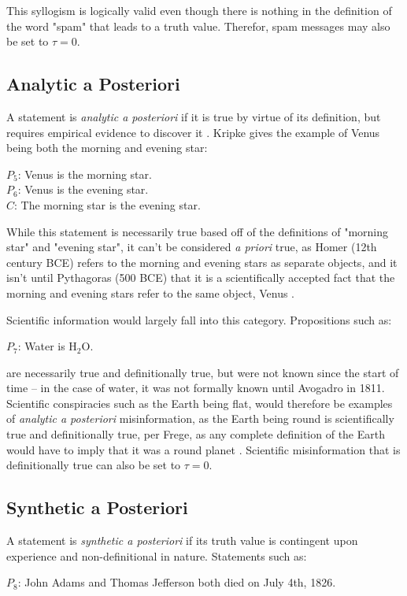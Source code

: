 \documentclass[12pt]{article}
\begin{document}
This syllogism is logically valid even though there is nothing in the definition of the word "spam" that leads to a truth value. Therefor, spam messages may also be set to $\tau = 0$.


\subsection{Analytic a Posteriori}
A statement is \textit{analytic a posteriori} if it is true by virtue of its definition, but requires empirical evidence to discover it \cite{kripke1972naming}. Kripke gives the example of Venus being both the morning and evening star: \begin{center}
   $P_5$: Venus is the morning star.\\
$P_6$: Venus is the evening star.\\
$C$: The morning star is the evening star. 
\end{center}


While this statement is necessarily true based off of the definitions of "morning star" and "evening star", it can't be considered \textit{a priori} true, as Homer (12th century BCE) refers to the morning and evening stars as separate objects, and it isn't until Pythagoras (500 BCE) that it is a scientifically accepted fact that the morning and evening stars refer to the same object, Venus \cite{dunne1978voyage}.

Scientific information would largely fall into this category. Propositions such as: 
\begin{center}
    $P_7$: Water is H$_2$O.
\end{center} 
are necessarily true and definitionally true, but were not known since the start of time -- in the case of water, it was not formally known until Avogadro in 1811. Scientific conspiracies such as the Earth being flat, would therefore be examples of \textit{analytic a posteriori} misinformation, as the Earth being round is scientifically true and definitionally true, per Frege, as any complete definition of the Earth would have to imply that it was a round planet \cite{frege2003sense}. Scientific misinformation that is definitionally true can also be set to $\tau = 0$.

\subsection{Synthetic a Posteriori}
A statement is \textit{synthetic a posteriori} if its truth value is contingent upon experience and non-definitional in nature. Statements such as: \begin{center}
    $P_8$: John Adams and Thomas Jefferson both died on July 4th, 1826.
\end{center}
\end{document}
